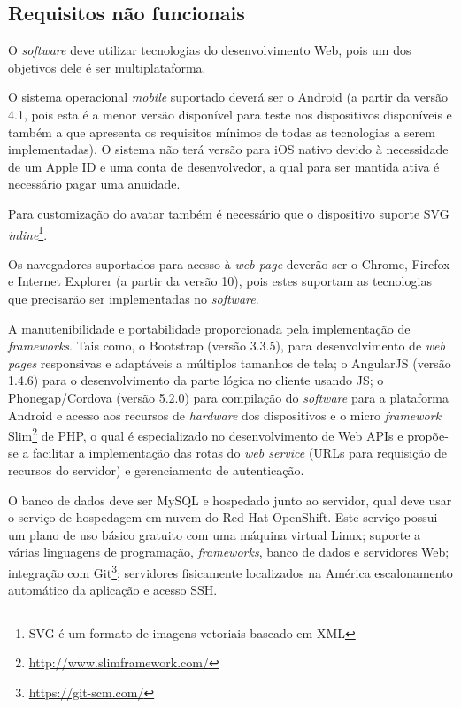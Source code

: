 \subsection{Requisitos não funcionais}
O \textit{software} deve utilizar tecnologias do desenvolvimento Web, pois um dos objetivos dele é ser multiplataforma.
\par
O sistema operacional \textit{mobile} suportado deverá ser o Android (a partir da versão 4.1, pois esta é a menor versão disponível para teste nos dispositivos disponíveis e também a que apresenta os requisitos mínimos de todas as tecnologias a serem implementadas). O sistema não terá versão para iOS nativo devido à necessidade de um Apple ID e uma conta de desenvolvedor, a qual para ser mantida ativa é necessário pagar uma anuidade.
\par
Para customização do avatar também é necessário que o dispositivo suporte SVG \textit{inline}\footnote{SVG é um formato de imagens vetoriais baseado em XML\cite{w3c2011svg}}.
\par
Os navegadores suportados para acesso à \textit{web page} deverão ser o Chrome, Firefox e Internet Explorer (a partir da versão 10), pois estes suportam as tecnologias que precisarão ser implementadas no \textit{software}.
\par
A manutenibilidade e portabilidade proporcionada pela implementação de \textit{frameworks}. Tais como, o Bootstrap (versão 3.3.5), para desenvolvimento de \textit{web pages} responsivas e adaptáveis a múltiplos tamanhos de tela; o AngularJS (versão 1.4.6) para o desenvolvimento da parte lógica no cliente usando JS; o Phonegap/Cordova (versão 5.2.0) para compilação do \textit{software} para a plataforma Android e acesso aos recursos de \textit{hardware} dos dispositivos
e o micro \textit{framework} Slim\footnote{\url{http://www.slimframework.com/}} de PHP, o qual é especializado no desenvolvimento de Web APIs e propõe-se a facilitar a implementação das rotas do \textit{web service} (URLs para requisição de recursos do servidor) e gerenciamento de autenticação.
\par
O banco de dados deve ser MySQL e hospedado junto ao servidor, qual deve usar o serviço de hospedagem em nuvem do Red Hat OpenShift. Este serviço possui um plano de uso básico gratuito com uma máquina virtual Linux; suporte a várias linguagens de programação, \textit{frameworks}, banco de dados e servidores Web; integração com Git\footnote{\url{https://git-scm.com/}}; servidores fisicamente localizados na América escalonamento automático da aplicação e acesso SSH.

